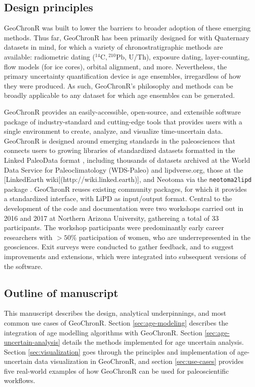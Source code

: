 \documentclass[gchron, manuscript]{copernicus}
\begin{document}
\subsection{Design principles}

GeoChronR was built to lower the barriers to broader adoption of these emerging methods.
Thus far, GeoChronR has been primarily designed for with Quaternary datasets in mind, for which a variety of chronostratigraphic methods are available: radiometric dating (\({}^{14}\mathrm{C}, {}^{210}\mathrm{Pb}\), U/Th), exposure dating, layer-counting, flow models (for ice cores), orbital alignment, and more.
Nevertheless, the primary uncertainty quantification device is age ensembles, irregardless of how they were produced.
As such, GeoChronR's philosophy and methods can be broadly applicable to any dataset for which age ensembles can be generated.

GeoChronR provides an easily-accessible, open-source, and extensible software package of industry-standard and cutting-edge tools that provides users with a single environment to create, analyze, and visualize time-uncertain data.
GeoChronR is designed around emerging standards in the paleosciences that connects users to growing libraries of standardized datasets formatted in the Linked PaleoData format \citep{lipd_cp}, including thousands of datasets archived at the World Data Service for Paleoclimatology (WDS-Paleo) and lipdverse.org, those at the {[}LinkedEarth wiki{[}(http://wiki.linked.earth){]}, and Neotoma \citep{williams2018neotoma} via the \texttt{neotoma2lipd} package \citep{neotoma2lipd}.
GeoChronR reuses existing community packages, for which it provides a standardized interface, with LiPD as input/output format.
Central to the development of the code and documentation were two workshops carried out in 2016 and 2017 at Northern Arizona University, gathereing a total of 33 participants.
The workshop participants were predominantly early career researchers with \(>50\%\) participation of women, who are underrepresented in the geosciences.
Exit surveys were conducted to gather feedback, and to suggest improvements and extensions, which were integrated into subsequent versions of the software.

\subsection{Outline of manuscript}

This manuscript describes the design, analytical underpinnings, and most common use cases of GeoChronR.
Section \ref{sec:age-modeling} describes the integration of age modelling algorithms with GeoChronR.
Section \ref{sec:age-uncertain-analysis} details the methods implemented for age uncertain analysis.
Section \ref{sec:visualization} goes through the principles and implementation of age-uncertain data visualization in GeoChronR, and section \ref{sec:use-cases} provides five real-world examples of how GeoChronR can be used for paleoscientific workflows.
\end{document}
